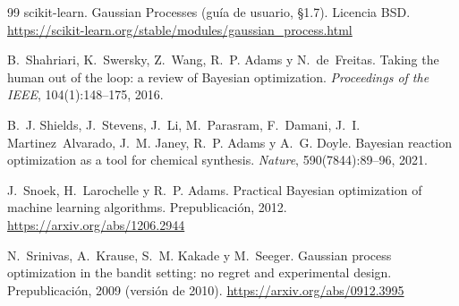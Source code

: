 \begin{thebibliography}{99}
scikit-learn.
\newblock Gaussian Processes (guía de usuario, §1.7). Licencia BSD.
\newblock \url{https://scikit-learn.org/stable/modules/gaussian_process.html}

B.~Shahriari, K.~Swersky, Z.~Wang, R.~P. Adams y N.~de~Freitas.
\newblock Taking the human out of the loop: a review of Bayesian optimization.
\newblock \emph{Proceedings of the IEEE}, 104(1):148--175, 2016.

B.~J. Shields, J.~Stevens, J.~Li, M.~Parasram, F.~Damani, J.~I. Martinez~Alvarado, J.~M. Janey, R.~P. Adams y A.~G. Doyle.
\newblock Bayesian reaction optimization as a tool for chemical synthesis.
\newblock \emph{Nature}, 590(7844):89--96, 2021.

J.~Snoek, H.~Larochelle y R.~P. Adams.
\newblock Practical Bayesian optimization of machine learning algorithms.
\newblock Prepublicación, 2012.
\newblock \url{https://arxiv.org/abs/1206.2944}

N.~Srinivas, A.~Krause, S.~M. Kakade y M.~Seeger.
\newblock Gaussian process optimization in the bandit setting: no regret and experimental design.
\newblock Prepublicación, 2009 (versión de 2010).
\newblock \url{https://arxiv.org/abs/0912.3995}

\end{thebibliography}
